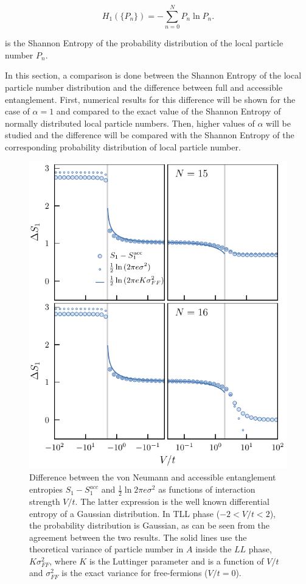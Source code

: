 %
\begin{equation}
    H_1(\{P_n\}) = -\sum_{n=0}^N P_n \ln P_n.
\label{eq:H1}
\end{equation}

is the Shannon Entropy of the probability distribution of the local particle number $P_n$.

In this section, a comparison is done between the Shannon Entropy of the local particle number distribution and the difference between full and accessible entanglement. First, numerical results for this difference will be shown for the case of $\alpha=1$ and compared to the exact value of the Shannon Entropy of normally distributed local particle numbers. Then, higher values of $\alpha$ will be studied and the difference will be compared with the Shannon Entropy of the corresponding probability distribution of local particle number.

\begin{figure}[htp]
\begin{center}
\includegraphics[width=1.0\columnwidth]{deltaS1_N15N16.pdf}
\end{center}
\caption{Difference between the von Neumann and accessible entanglement entropies $S_{1}-S_{1}^{acc}$ and $\frac{1}{2} \ln 2 \pi e \sigma^2$ as functions of interaction strength $V/t$. The latter expression is the well known differential entropy of a Gaussian distribution. In TLL phase ($-2 < V/t < 2$), the probability distribution is Gaussian, as can be seen from the agreement between the two results. The solid lines use the theoretical variance of particle number in $A$ inside the $LL$ phase, $K \sigma^2_{FF}$, where $K$ is the Luttinger parameter and is a function of $V/t$ and $\sigma^2_{FF}$ is the exact variance for free-fermions ($V/t = 0$).}
\label{fig:deltaS1}
\end{figure}

